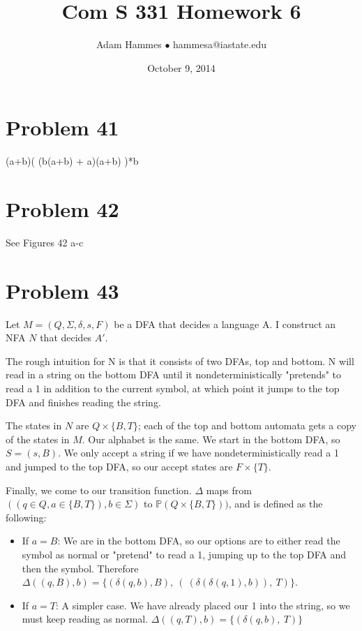 \documentclass[11pt]{article}
\begin{document}
\title{Com S 331 Homework 6}
\author{Adam Hammes $\bullet$ hammesa@iastate.edu}
\date{October 9, 2014}
\maketitle

\section*{Problem 41}

(a+b)( (b(a+b) + a)(a+b) )*b

\section*{Problem 42}

See Figures 42 a-c

\section*{Problem 43}

Let $M = (Q,\Sigma,\delta,s,F)$ be a DFA that decides a language A. I construct an NFA $N$ that decides $A'$.

The rough intuition for N is that it consists of two DFAs, top and bottom. N will read in a string on the bottom DFA until it nondeterministically "pretends" to read a 1 in addition to the current symbol, at which point it jumps to the top DFA and finishes reading the string.

The states in $N$ are $Q \times \{B,T\}$; each of the top and bottom automata gets a copy of the states in $M$. Our alphabet is the same. We start in the bottom DFA, so $S = (s,B)$. We only accept a string if we have nondeterministically read a 1 and jumped to the top DFA, so our accept states are $F \times \{T\}$.

Finally, we come to our transition function. $\Delta$ maps from $((q \in Q, a \in \{B,T\}) , b \in \Sigma)$ to $ \mathbb{P}(Q \times \{B,T\}))$, and is defined as the following:

\begin{itemize}
	\item If $a = B$: We are in the bottom DFA, so our options are to either read the symbol as normal or "pretend" to read a 1, jumping up to the top DFA and then the symbol. Therefore $\Delta((q, B), b) = \{ (\delta(q, b), B),\ (\ (\delta( \delta( q, 1), b)),\  T) \}$.
	
	\item If $a = T$: A simpler case. We have already placed our 1 into the string, so we must keep reading as normal. $\Delta((q, T), b) = \{ (\delta(q, b),\ T) \}$
\end{itemize}
\end{document}
